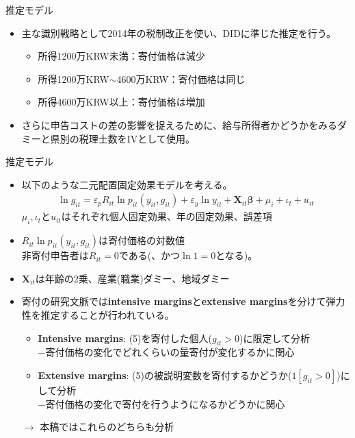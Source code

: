 \documentclass[dvipdfmx,10pt]{beamer}
\begin{document}
\begin{frame}{推定モデル}
\begin{itemize}
	\item 主な識別戦略として2014年の税制改正を使い、DIDに準じた推定を行う。
	\begin{itemize}
		\item 所得1200万KRW未満：寄付価格は減少
		\item 所得1200万KRW$\sim$4600万KRW：寄付価格は同じ
		\item 所得4600万KRW以上：寄付価格は増加
	\end{itemize}
	\item さらに申告コストの差の影響を捉えるために、給与所得者かどうかをみるダミーと県別の税理士数をIVとして使用。
\end{itemize}
\end{frame}

\begin{frame}{推定モデル}
	\begin{itemize}
		\item 以下のような二元配置固定効果モデルを考える。
		\begin{align}
			\ln g_{it} = \varepsilon_pR_{it} \ln p_{it}(y_{it}, g_{it}) + \varepsilon_y \ln y_{it} + \bm{X}_{it}\bm{\beta} + \mu_i + \iota_t + u_{it}\tag{5}
		\end{align}
	$\mu_i, \iota_t$と$ u_{it}$はそれぞれ個人固定効果、年の固定効果、誤差項 
	\item $R_{it} \ln p_{it}(y_{it}, g_{it})$は寄付価格の対数値\\
	非寄付申告者は$R_{it}=0$である(、かつ$\ln 1=0$となる)。
	\item $\bm{X}_{it}$は年齢の2乗、産業(職業)ダミー、地域ダミー
	\item 寄付の研究文脈では\textbf{intensive margins}と\textbf{extensive margins}を分けて弾力性を推定することが行われている。
	\begin{itemize}
		\item \textbf{Intensive margins}: (5)を寄付した個人($g_{it}>0$)に限定して分析\\
		$-$寄付価格の変化でどれくらいの量寄付が変化するかに関心
		\item \textbf{Extensive margins}: (5)の被説明変数を寄付するかどうか($1[g_{it}>0]$)にして分析\\
		$-$寄付価格の変化で寄付を行うようになるかどうかに関心
	\end{itemize}
	$\to$ 本稿ではこれらのどちらも分析
	\end{itemize}
\end{frame}
\end{document}
